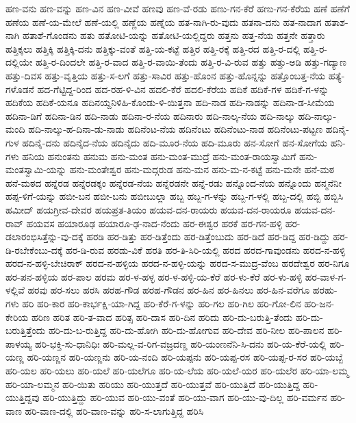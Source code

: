 ಹಣ-ವನು
ಹಣ-ವನ್ನು
ಹಣ-ವಿನ
ಹಣ-ವೀವೆ
ಹಣವು
ಹಣ-ವೆ-ರಡು
ಹಣು-ಗನ-ಕೆರೆ
ಹಣು-ಗನ-ಕೆರೆಯ
ಹಣೆ
ಹಣೆಗೆ
ಹಣೆಯ
ಹಣೆ-ಯ-ಮೇಲೆ
ಹಣೆ-ಯಲ್ಲಿ
ಹಣ್ಣೆಯ
ಹಣ್ನೆಯ
ಹತ-ನಾಗಿ-ರು-ವುದು
ಹತನಾ-ದನು
ಹತ-ನಾದಾಗ
ಹತಾಶ-ನಾಗಿ
ಹತಾಶೆ-ಗೊಂಡನು
ಹತು
ಹತೋಟಿ-ಯನ್ನು
ಹತೋಟಿ-ಯಲ್ಲಿದ್ದರು
ಹತ್ತನು
ಹತ್ತ-ನೆಯ
ಹತ್ತನೇ
ಹತ್ತಾರು
ಹತ್ತಿಕ್ಕಲು
ಹತ್ತಿಕ್ಕಿ
ಹತ್ತಿಕ್ಕಿ-ದನು
ಹತ್ತಿಕ್ಕು-ವಂತೆ
ಹತ್ತಿ-ಯ-ಕಟ್ಟೆ
ಹತ್ತಿರ
ಹತ್ತಿ-ರಕ್ಕೆ
ಹತ್ತಿ-ರದ
ಹತ್ತಿ-ರ-ದಲ್ಲಿ
ಹತ್ತಿ-ರ-ದಲ್ಲಿಯೇ
ಹತ್ತಿ-ರ-ದಿಂದಲೇ
ಹತ್ತಿ-ರ-ವಾದ
ಹತ್ತಿ-ರ-ವಾಯಿ-ತೆಂದು
ಹತ್ತಿ-ರ-ವಿ-ರುವ
ಹತ್ತು
ಹತ್ತು-ಅಡಿ
ಹತ್ತು-ಗದ್ಯಾಣ
ಹತ್ತು-ದಿವಸ
ಹತ್ತು-ವೃತ್ತಿಯ
ಹತ್ತು-ಸ-ಲಗೆ
ಹತ್ತು-ಸಾವಿರ
ಹತ್ತು-ಹೊಂನ
ಹತ್ತು-ಹೊನ್ನನ್ನು
ಹತ್ತೊಂಬತ್ತ-ನೆಯ
ಹತ್ಯೆ-ಗಳೊಡನೆ
ಹದ-ಗೆಟ್ಟಿದ್ದ-ರಿಂದ
ಹದ-ರಹ-ಳಿ-ವಿನ
ಹದಲಿ-ಕೆರೆ
ಹದಲಿ-ಕೆರೆಯ
ಹದಿಕೆ
ಹದಿಕೆ-ಗಳ
ಹದಿಕೆ-ಗ-ಳನ್ನು
ಹದಿಕೆಯ
ಹದಿಕೆ-ಯನೂ
ಹದಿನಯ್ದನಿಳಿಹಿ-ಕೊಂಡು-ಳಿ-ಯಿತ್ತನಾ
ಹದಿ-ನಾಡ
ಹದಿ-ನಾಡನ್ನು
ಹದಿನಾ-ಡ-ಸೀಮೆಯ
ಹದಿನಾ-ಡಿಗೆ
ಹದಿನಾ-ಡಿನ
ಹದಿ-ನಾಡು
ಹದಿನಾ-ರ-ನೆಯ
ಹದಿನಾರು
ಹದಿ-ನಾಲ್ಕ-ನೆಯ
ಹದಿ-ನಾಲ್ಕು
ಹದಿ-ನಾಲ್ಕು-ಮಂದಿ
ಹದಿ-ನಾಲ್ಕು-ಹ-ದಿನಾ-ಡು-ನಾಡು
ಹದಿನೆಂಟ-ನೆಯ
ಹದಿನೆಂಟು
ಹದಿನೆಂಟು-ನಾಡ
ಹದಿನೆಂಟು-ಪಟ್ಟಣ
ಹದಿನೈ-ಗುಳ
ಹದಿನೈ-ದನು
ಹದಿನೈದ-ನೆಯ
ಹದಿನೈದು
ಹದಿ-ಮೂರ-ನೆಯ
ಹದಿ-ಮೂರು
ಹನ-ಸೋಗೆ
ಹನ-ಸೋಗೆಯ
ಹನಿ-ಗಳು
ಹನಿಯ
ಹನುಂತನು
ಹನುಮ
ಹನು-ಮಂತ
ಹನು-ಮಂತ-ಮುದ್ರೆ
ಹನು-ಮಂತ-ರಾಯಸ್ವಾಮಿಗೆ
ಹನು-ಮಂತಸ್ವಾಮಿ-ಯನ್ನು
ಹನು-ಮಂತೇಶ್ವರ
ಹನು-ಮದ್ಗರುಡ
ಹನು-ಮನ
ಹನು-ಮ-ನ-ಕಟ್ಟೆ
ಹನು-ಮನೇ
ಹನೆ-ಮಠ
ಹನೆ-ಮಠದ
ಹನ್ನೆರಡ
ಹನ್ನೆರಡಕ್ಕಂ
ಹನ್ನೆರಡ-ನೆಯ
ಹನ್ನೆರಡನೇ
ಹನ್ನೆ-ರಡು
ಹನ್ನೊಂದ-ನೆಯ
ಹನ್ನೊಂದು
ಹನ್ಮನೆನೀ
ಹಪ್ಪ-ಳಿಗೆ-ಯನ್ನು
ಹಬೀ-ಬನ
ಹಬೀ-ಬನು
ಹಬೀಬುಲ್ಲಾ
ಹಬ್ಬ
ಹಬ್ಬ-ಗ-ಳನ್ನು
ಹಬ್ಬ-ಗ-ಳಲ್ಲಿ
ಹಬ್ಬ-ದಲ್ಲಿ
ಹಬ್ಬಿ
ಹಬ್ಬಿಸಿ
ಹಮೀದ್
ಹಯಗ್ರೀವ-ದೇವರ
ಹಯಪ್ರತ-ತಿಯಂ
ಹಯವ-ದನ-ರಾಯರು
ಹಯವ-ದನ-ರಾಯರೂ
ಹಯವ-ದನ-ರಾವ್
ಹಯವಸ
ಹಯಾರೂಢ
ಹಯಾರೂ-ಢ-ನಾದ-ನೆಂದು
ಹರ-ಈಶ್ವರ
ಹರಕೆ
ಹರ-ಗನ-ಹಳ್ಳಿ
ಹರ-ಡಲಾರಂಭಿಸಿತ್ತೆನ್ನು-ವು-ದಕ್ಕೆ
ಹರಡಿ
ಹರ-ಡಿತ್ತು
ಹರ-ಡಿತ್ತೆಂದು
ಹರ-ಡಿತ್ತೆಂಬುದು
ಹರ-ಡಿದೆ
ಹರ-ಡಿದ್ದ
ಹರ-ಡಿದ್ದು
ಹರ-ಡಿ-ರಬೇಕೆಂಬು-ದಕ್ಕೆ
ಹರ-ಡಿ-ರುವ
ಹರಡು-ವಿಕೆ
ಹರತಿ
ಹರ-ತಿ-ಸಿರಿ-ಯಲ್ಲಿ
ಹರದ
ಹರದ-ಗಾವುಂಡನು
ಹರದ-ನ-ಹಳ್ಳಿ
ಹರದ-ನ-ಹಳ್ಳಿ-ಬೇಚಿರಾಕ್
ಹರದ-ನ-ಹಳ್ಳಿಯ
ಹರದ-ನ-ಹಳ್ಳಿ-ಯನ್ನು
ಹರದ-ಸ-ಮುದ್ರ-ವೆಂಬ
ಹರದೇಶ್ವರ
ಹರ-ನಿಗೂ
ಹರ-ಪನ-ಹಳ್ಳಿಯ
ಹರ-ಪಾಲ
ಹರಮ
ಹರ-ಳ-ಹಳ್ಳ
ಹರ-ಳ-ಹಳ್ಳಿ-ಯ-ಕೆರೆ
ಹರ-ಳು-ಕೆರೆ
ಹರ-ಳು-ಹಳ್ಳಿ
ಹರ-ವಾಳ-ಗ-ಳಲ್ಲಿವೆ
ಹರವು
ಹರ-ಸಲು
ಹರಸಿ
ಹರಹ-ಗೌಡ
ಹರಹ-ಗೌಡನ
ಹರ-ಹಿನ
ಹರ-ಹಿನಲು
ಹರ-ಹಿನ-ವರೆಗೂ
ಹರಹು-ಗಳು
ಹರಿ
ಹರಿ-ಕಾರ
ಹರಿ-ಕಾರ್ಭಕ್ಷಿ-ಯಾ-ಗಿದ್ದ
ಹರಿ-ಕೆರೆ-ಗ-ಳನ್ನು
ಹರಿ-ಗಲ
ಹರಿ-ಗಿಲ
ಹರಿ-ಗೋ-ಲಿನ
ಹರಿ-ಜನ-ಕೇರಿಯ
ಹರಿಣ
ಹರಿತ
ಹರಿ-ತ-ವಾದ
ಹರಿತ್ಸ
ಹರಿ-ದಾಸ
ಹರಿ-ದಿನ
ಹರಿದು
ಹರಿ-ದು-ಬರುತ್ತಿ-ತೆಂದು
ಹರಿ-ದು-ಬರುತ್ತಿತ್ತೆಂದು
ಹರಿ-ದು-ಬ-ರುತ್ತಿದ್ದ
ಹರಿ-ದು-ಹೋಗಿ
ಹರಿ-ದು-ಹೋಗುವ
ಹರಿ-ದೇವ
ಹರಿ-ನೀಲ
ಹರಿ-ಪಾಲನ
ಹರಿ-ಪಾಳಯ್ಯ
ಹರಿ-ಭಕ್ತಿ-ಸು-ಧಾನಿಧಿಃ
ಹರಿ-ಮಲ್ಲ-ವ-ರಿಗ-ವಜ್ರದಣ್ಡ
ಹರಿ-ಯಂಣನೆನಿ-ಸಿ-ದನು
ಹರಿ-ಯ-ಕೆರೆ-ಯಲ್ಲಿ
ಹರಿ-ಯಣ್ಣ
ಹರಿ-ಯಣ್ಣನ
ಹರಿ-ಯಣ್ಣನು
ಹರಿ-ಯ-ನಂದಿ
ಹರಿ-ಯಪ್ಪನು
ಹರಿ-ಯಪ್ಪ-ರಸ
ಹರಿ-ಯಪ್ಪ-ರ-ಸರ
ಹರಿ-ಯಬ್ಬೆ
ಹರಿ-ಯಲ
ಹರಿ-ಯಲು
ಹರಿ-ಯಲೆ
ಹರಿ-ಯಲೆಗೂ
ಹರಿ-ಯ-ಲೆಯ
ಹರಿ-ಯಲೆ-ಯರ
ಹರಿ-ಯಲೆರ
ಹರಿ-ಯಾ-ಲಮ್ಮ
ಹರಿ-ಯಾ-ಲಮ್ಮನ
ಹರಿ-ಯಿತು
ಹರಿಯು
ಹರಿ-ಯುತ್ತದೆ
ಹರಿ-ಯುತ್ತವೆ
ಹರಿ-ಯುತ್ತಿದೆ
ಹರಿ-ಯುತ್ತಿದ್ದ
ಹರಿ-ಯುತ್ತಿದ್ದವು
ಹರಿ-ಯುತ್ತಿದ್ದು
ಹರಿ-ಯುವ
ಹರಿ-ಯು-ವಂತೆ
ಹರಿ-ಯು-ವಾಗ
ಹರಿ-ಯು-ವು-ದಿಲ್ಲ
ಹರಿ-ವರ್ಮನ
ಹರಿ-ವಾಣ
ಹರಿ-ವಾಣ-ದಲ್ಲಿ
ಹರಿ-ವಾಣ-ವನ್ನು
ಹರಿ-ಸ-ಲಾಗುತ್ತಿದ್ದ
ಹರಿಸಿ
